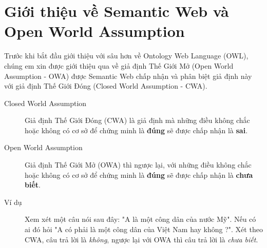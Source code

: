 \chapter{Giới thiệu về Semantic Web và Open World Assumption}
Trước khi bắt đầu giới thiệu với sâu hơn về Ontology Web Language (OWL), chúng em xin được giới thiệu qua về giả định Thế Giới Mở (Open World Assumption - OWA) được Semantic Web chấp nhận và phân biệt giả định này với giả định Thế Giới Đóng (Closed World Assumption - CWA).
\begin{description}
\item[Closed World Assumption] 
Giả định Thế Giới Đóng (CWA) là giả định mà những điều không chắc hoặc không có cơ sở để chứng minh là \textbf{đúng} sẽ được chấp nhận là \textbf{sai}.
\item[Open World Assumption]
Giả định Thế Giới Mở (OWA) thì ngược lại, với những điều không chắc hoặc không có cơ sở để chứng minh là \textbf{đúng} sẽ được chấp nhận là \textbf{chưa biết}. 
\item[Ví dụ]
Xem xét một câu nói sau đây: "A là một công dân của nước Mỹ". Nếu có ai đó hỏi "A có phải là một công dân của Việt Nam hay không ?". Xét theo CWA, câu trả lời là \textit{không}, ngược lại với OWA thì câu trả lời là \textit{chưa biết}. 
\end{description}
